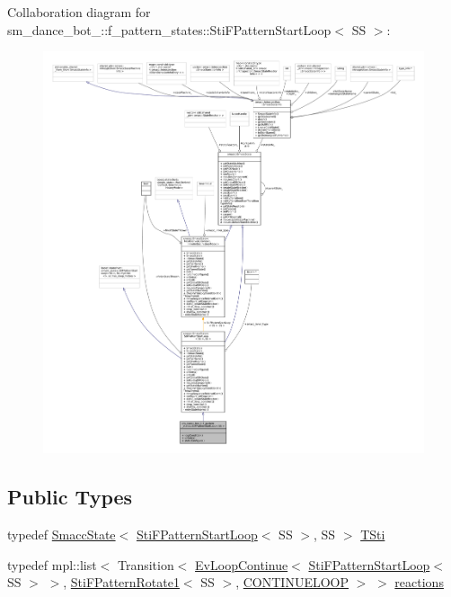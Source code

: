 Collaboration diagram for sm\+\_\+dance\+\_\+bot\+\_\+:\+:f\+\_\+pattern\+\_\+states\+:\+:Sti\+F\+Pattern\+Start\+Loop$<$ SS $>$\+:
\nopagebreak
\begin{figure}[H]
\begin{center}
\leavevmode
\includegraphics[width=350pt]{classsm__dance__bot__2_1_1f__pattern__states_1_1StiFPatternStartLoop__coll__graph}
\end{center}
\end{figure}
\subsection*{Public Types}
\begin{DoxyCompactItemize}
\item 
typedef \hyperlink{classSmaccState}{Smacc\+State}$<$ \hyperlink{classsm__dance__bot__2_1_1f__pattern__states_1_1StiFPatternStartLoop}{Sti\+F\+Pattern\+Start\+Loop}$<$ SS $>$, SS $>$ \hyperlink{classsm__dance__bot__2_1_1f__pattern__states_1_1StiFPatternStartLoop_a9356cd8c0458f8b0854939cebf8e1095}{T\+Sti}
\item 
typedef mpl\+::list$<$ Transition$<$ \hyperlink{structsmacc_1_1default__events_1_1EvLoopContinue}{Ev\+Loop\+Continue}$<$ \hyperlink{classsm__dance__bot__2_1_1f__pattern__states_1_1StiFPatternStartLoop}{Sti\+F\+Pattern\+Start\+Loop}$<$ SS $>$ $>$, \hyperlink{classsm__dance__bot__2_1_1f__pattern__states_1_1StiFPatternRotate1}{Sti\+F\+Pattern\+Rotate1}$<$ SS $>$, \hyperlink{structsmacc_1_1default__transition__tags_1_1CONTINUELOOP}{C\+O\+N\+T\+I\+N\+U\+E\+L\+O\+OP} $>$ $>$ \hyperlink{classsm__dance__bot__2_1_1f__pattern__states_1_1StiFPatternStartLoop_a93f6fd1001554fdafc79b058c2162c5f}{reactions}
\end{DoxyCompactItemize}
